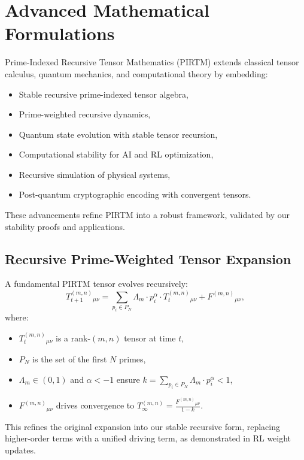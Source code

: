 \documentclass{article}
\theoremstyle{plain}
\begin{document}
\section{Advanced Mathematical Formulations}
Prime-Indexed Recursive Tensor Mathematics (PIRTM) extends classical tensor calculus, quantum mechanics, and computational theory by embedding:
\begin{itemize}
    \item Stable recursive prime-indexed tensor algebra,
    \item Prime-weighted recursive dynamics,
    \item Quantum state evolution with stable tensor recursion,
    \item Computational stability for AI and RL optimization,
    \item Recursive simulation of physical systems,
    \item Post-quantum cryptographic encoding with convergent tensors.
\end{itemize}
These advancements refine PIRTM into a robust framework, validated by our stability proofs and applications.

\subsection{Recursive Prime-Weighted Tensor Expansion}
A fundamental PIRTM tensor evolves recursively:
\begin{equation}
    T_{t+1}^{(m,n)}{}_{\mu\nu} = \sum_{p_i \in P_N} \Lambda_m \cdot p_i^\alpha \cdot T_t^{(m,n)}{}_{\mu\nu} + F^{(m,n)}{}_{\mu\nu},
\end{equation}
where:
\begin{itemize}
    \item \( T_t^{(m,n)}{}_{\mu\nu} \) is a rank-$(m,n)$ tensor at time \( t \),
    \item \( P_N \) is the set of the first \( N \) primes,
    \item \( \Lambda_m \in (0, 1) \) and \( \alpha < -1 \) ensure \( k = \sum_{p_i \in P_N} \Lambda_m \cdot p_i^\alpha < 1 \),
    \item \( F^{(m,n)}{}_{\mu\nu} \) drives convergence to \( T_\infty^{(m,n)} = \frac{F^{(m,n)}{}_{\mu\nu}}{1 - k} \).
\end{itemize}
This refines the original expansion into our stable recursive form, replacing higher-order terms with a unified driving term, as demonstrated in RL weight updates.
\end{document}
